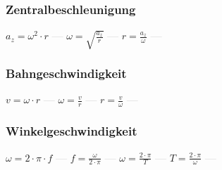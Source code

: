 \subsubsection{Zentralbeschleunigung} 
\begin{minipage}{0.45\textwidth} 
\end{minipage} 
\begin{minipage}{0.45\textwidth} 
 
\end{minipage} 
$ a_{z}  = \omega ^{2} \cdot r $ \textcolor{lightgray}{\textbf{---}} 
$ \omega  = \sqrt{\frac{a_{z} }{r}} $ \textcolor{lightgray}{\textbf{---}} 
$ r = \frac{a_{z} }{\omega } $ \textcolor{lightgray}{\textbf{---}} 

\subsubsection{Bahngeschwindigkeit} 
\begin{minipage}{0.45\textwidth} 
\end{minipage} 
\begin{minipage}{0.45\textwidth} 
 
\end{minipage} 
$ v = \omega \cdot r $ \textcolor{lightgray}{\textbf{---}} 
$ \omega  = \frac{v}{r} $ \textcolor{lightgray}{\textbf{---}} 
$ r = \frac{v}{\omega } $ \textcolor{lightgray}{\textbf{---}} 

\subsubsection{Winkelgeschwindigkeit} 
\begin{minipage}{0.45\textwidth} 
\end{minipage} 
\begin{minipage}{0.45\textwidth} 
 
\end{minipage} 
$ \omega  = 2\cdot \pi \cdot f $ \textcolor{lightgray}{\textbf{---}} 
$ f = \frac{\omega }{2\cdot \pi } $ \textcolor{lightgray}{\textbf{---}} 
$ \omega  = \frac{2\cdot \pi }{ T} $ \textcolor{lightgray}{\textbf{---}} 
$ T = \frac{2\cdot \pi }{ \omega } $ \textcolor{lightgray}{\textbf{---}} 


